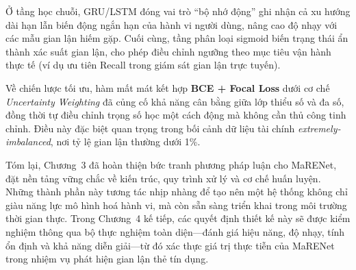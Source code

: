 Ở tầng học chuỗi, GRU/LSTM đóng vai trò “bộ nhớ động” ghi nhận cả xu hướng dài hạn lẫn biến động ngắn hạn của hành vi người dùng, nâng cao độ nhạy với các mẫu gian lận hiếm gặp. Cuối cùng, tầng phân loại sigmoid biến trạng thái ẩn thành xác suất gian lận, cho phép điều chỉnh ngưỡng theo mục tiêu vận hành thực tế (ví dụ ưu tiên Recall trong giám sát gian lận trực tuyến).

Về chiến lược tối ưu, hàm mất mát kết hợp \textbf{BCE + Focal Loss} dưới cơ chế \emph{Uncertainty Weighting} đã củng cố khả năng cân bằng giữa lớp thiểu số và đa số, đồng thời tự điều chỉnh trọng số học một cách động mà không cần thủ công tinh chỉnh. Điều này đặc biệt quan trọng trong bối cảnh dữ liệu tài chính \emph{extremely‐imbalanced}, nơi tỷ lệ gian lận thường dưới 1\%.

Tóm lại, Chương~3 đã hoàn thiện bức tranh phương pháp luận cho MaRENet, đặt nền tảng vững chắc về kiến trúc, quy trình xử lý và cơ chế huấn luyện. Những thành phần này tương tác nhịp nhàng để tạo nên một hệ thống không chỉ giàu năng lực mô hình hoá hành vi, mà còn sẵn sàng triển khai trong môi trường thời gian thực. Trong Chương~4 kế tiếp, các quyết định thiết kế này sẽ được kiểm nghiệm thông qua bộ thực nghiệm toàn diện—đánh giá hiệu năng, độ nhạy, tính ổn định và khả năng diễn giải—từ đó xác thực giá trị thực tiễn của MaRENet trong nhiệm vụ phát hiện gian lận thẻ tín dụng.




